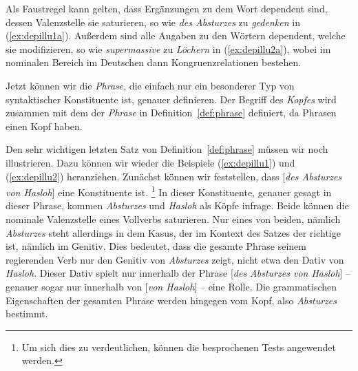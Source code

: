 
Als Faustregel kann gelten, dass Ergänzungen zu dem Wort dependent sind, dessen Valenzstelle sie saturieren, so wie \textit{des Absturzes} zu \textit{gedenken} in (\ref{ex:depillu1a}).
Außerdem sind alle Angaben zu den Wörtern dependent, welche sie modifizieren, so wie \textit{supermassive} zu \textit{Löchern} in (\ref{ex:depillu2a}), wobei im nominalen Bereich im Deutschen dann Kongruenzrelationen bestehen.

Jetzt können wir die \textit{Phrase}, die einfach nur ein besonderer Typ von syntaktischer Konstituente ist, genauer definieren.
Der Begriff des \textit{Kopfes} wird zusammen mit dem der \textit{Phrase} in Definition~\ref{def:phrase} definiert, da Phrasen einen Kopf haben.



Den sehr wichtigen letzten Satz von Definition~\ref{def:phrase} müssen wir noch illustrieren.
Dazu können wir wieder die Beispiele (\ref{ex:depillu1}) und (\ref{ex:depillu2}) heranziehen.
Zunächst können wir feststellen, dass [\textit{des Absturzes von Hasloh}] eine Konstituente ist.%
\footnote{Um sich dies zu verdeutlichen, können die besprochenen Tests angewendet werden.}
In dieser Konstituente, genauer gesagt in dieser Phrase, kommen \textit{Absturzes} und \textit{Hasloh} als Köpfe infrage.
Beide können die nominale Valenzstelle eines Vollverbs saturieren.
Nur eines von beiden, nämlich \textit{Absturzes} steht allerdings in dem Kasus, der im Kontext des Satzes der richtige ist, nämlich im Genitiv.
Dies bedeutet, dass die gesamte Phrase seinem regierenden Verb nur den Genitiv von \textit{Absturzes} zeigt, nicht etwa den Dativ von \textit{Hasloh}.
Dieser Dativ spielt nur innerhalb der Phrase [\textit{des Absturzes von Hasloh}] -- genauer sogar nur innerhalb von [\textit{von Hasloh}] -- eine Rolle.
Die grammatischen Eigenschaften der gesamten Phrase werden hingegen vom Kopf, also \textit{Absturzes} bestimmt.

